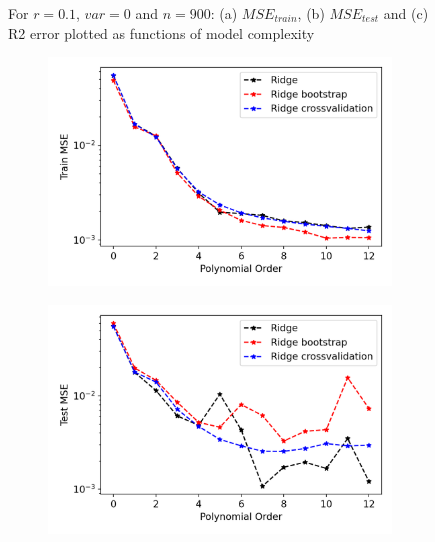 \begin{figure}
\begin{subfigure}{.5\textwidth}
  \caption{}
  \label{fig:ridge10}
\end{subfigure}
\caption{For $r=0.1$, $var=0$ and $n=900$: (a) $MSE_{train}$, (b) $MSE_{test}$ and (c) R2 error plotted as functions of model complexity}
\label{fig:Ridge_resample}
\end{figure}



\begin{figure}
\centering
\begin{subfigure}{.5\textwidth}
  \centering
  \includegraphics[width=.9\linewidth]{Images/ridge12.png}
  \caption{}
  \label{fig:ridge12}
\end{subfigure}%
\begin{subfigure}{.5\textwidth}
  \centering
  \includegraphics[width=.9\linewidth]{Images/ridge11.png}
  \caption{}
  \label{fig:ridge11}
\end{subfigure}
\begin{subfigure}{.5\textwidth}
  \centering

\end{subfigure}
\end{figure}
